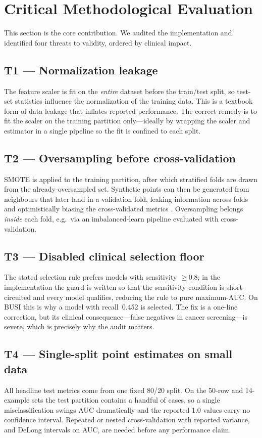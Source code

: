 \documentclass[10pt,twocolumn]{article}
\begin{document}
\section{Critical Methodological Evaluation}
This section is the core contribution. We audited the implementation and
identified four threats to validity, ordered by clinical impact.

\subsection{T1 --- Normalization leakage}
The feature scaler is fit on the \emph{entire} dataset before the train/test
split, so test-set statistics influence the normalization of the training data.
This is a textbook form of data leakage that inflates reported performance. The
correct remedy is to fit the scaler on the training partition only---ideally by
wrapping the scaler and estimator in a single pipeline so the fit is confined to
each split.

\subsection{T2 --- Oversampling before cross-validation}
SMOTE is applied to the training partition, after which stratified folds are
drawn from the already-oversampled set. Synthetic points can then be generated
from neighbours that later land in a validation fold, leaking information across
folds and optimistically biasing the cross-validated metrics
\cite{santos2018crossval}. Oversampling belongs \emph{inside} each fold, e.g.\
via an imbalanced-learn pipeline evaluated with cross-validation.

\subsection{T3 --- Disabled clinical selection floor}
The stated selection rule prefers models with sensitivity $\geq 0.8$; in the
implementation the guard is written so that the sensitivity condition is
short-circuited and every model qualifies, reducing the rule to pure
maximum-AUC. On BUSI this is why a model with recall~0.452 is selected. The fix
is a one-line correction, but its clinical consequence---false negatives in
cancer screening---is severe, which is precisely why the audit matters.

\subsection{T4 --- Single-split point estimates on small data}
All headline test metrics come from one fixed 80/20 split. On the 50-row and
14-example sets the test partition contains a handful of cases, so a single
misclassification swings AUC dramatically and the reported 1.0 values carry no
confidence interval. Repeated or nested cross-validation with reported variance,
and DeLong intervals on AUC, are needed before any performance claim.
\end{document}
